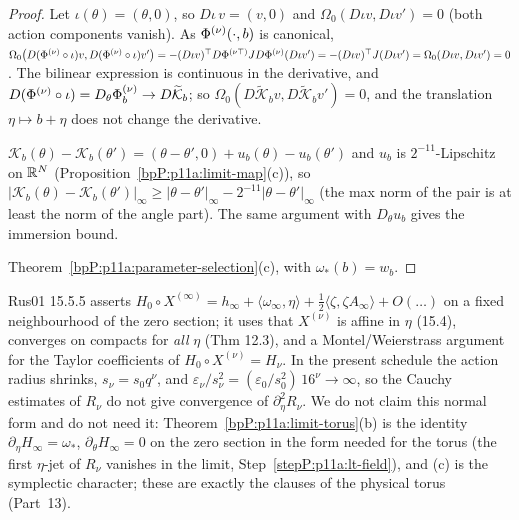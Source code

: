 \begin{proof}
\label{stepP:p11a:lt-lag} Let $\iota(\theta)=(\theta,0)$, so $D\iota\,v=(v,0)$ and $\Omega_0(D\iota v,D\iota v')=0$ (both action components vanish). As $\Phi^{(\nu)}(\cdot,b)$ is canonical, $\Omega_0\bigl(D(\Phi^{(\nu)}\circ\iota)v,D(\Phi^{(\nu)}\circ\iota)v'\bigr)=-(D\iota v)^{\top}D\Phi^{(\nu\top)}JD\Phi^{(\nu)}(D\iota v')=-(D\iota v)^{\top}J(D\iota v')=\Omega_0(D\iota v,D\iota v')=0$. The bilinear expression is continuous in the derivative, and $D(\Phi^{(\nu)}\circ\iota)=D_\theta\Phi^{(\nu)}_b\to D\widetilde{\mathcal K}_b$; so $\Omega_0(D\widetilde{\mathcal K}_bv,D\widetilde{\mathcal K}_bv')=0$, and the translation $\eta\mapsto b+\eta$ does not change the derivative.

\label{stepP:p11a:lt-emb} $\mathcal K_b(\theta)-\mathcal K_b(\theta')=(\theta-\theta',0)+u_b(\theta)-u_b(\theta')$ and $u_b$ is $2^{-11}$-Lipschitz on $\mathbb{R}^N$ (Proposition~\ref{bpP:p11a:limit-map}(c)), so $\lvert\mathcal K_b(\theta)-\mathcal K_b(\theta')\rvert_\infty\ge\lvert\theta-\theta'\rvert_\infty-2^{-11}\lvert\theta-\theta'\rvert_\infty$ (the max norm of the pair is at least the norm of the angle part). The same argument with $D_\theta u_b$ gives the immersion bound.

\label{stepP:p11a:lt-dio} Theorem~\ref{bpP:p11a:parameter-selection}(c), with $\omega_*(b)=w_b$.
\end{proof}

\begin{remark}\label{bpP:p11a:no-normal-form}
Rus01 15.5.5 asserts $H_0\circ X^{(\infty)}=h_\infty+\langle\omega_\infty,\eta\rangle+\tfrac12\langle\zeta,\zeta A_\infty\rangle+O(\dots)$ on a fixed neighbourhood of the zero section; it uses that $X^{(\nu)}$ is affine in $\eta$ (15.4), converges on compacts for \emph{all} $\eta$ (Thm 12.3), and a Montel/Weierstrass argument for the Taylor coefficients of $H_0\circ X^{(\nu)}=H_\nu$. In the present schedule the action radius shrinks, $s_\nu=s_0q^\nu$, and $\varepsilon_\nu/s_\nu^2=(\varepsilon_0/s_0^2)\,16^\nu\to\infty$, so the Cauchy estimates of $R_\nu$ do not give convergence of $\partial_\eta^2R_\nu$. We do not claim this normal form and do not need it: Theorem~\ref{bpP:p11a:limit-torus}(b) is the identity $\partial_\eta H_\infty=\omega_*$, $\partial_\theta H_\infty=0$ on the zero section in the form needed for the torus (the first $\eta$-jet of $R_\nu$ vanishes in the limit, Step~\ref{stepP:p11a:lt-field}), and (c) is the symplectic character; these are exactly the clauses of the physical torus (Part~13). 
\end{remark}

